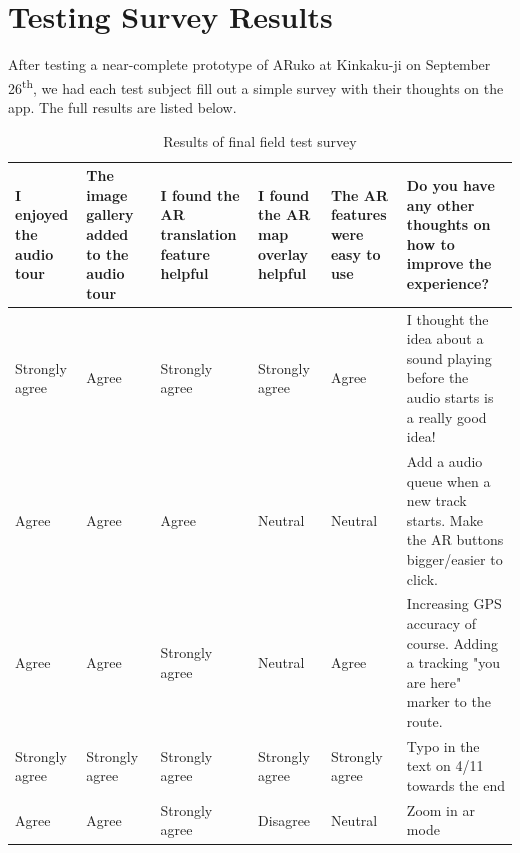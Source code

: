\documentclass[a4paper, 10pt, american, titlepage]{article}
\begin{document}
\clearpage

\section{Testing Survey Results}
\label{sec:testingSurveyResults}

After testing a near-complete prototype of ARuko at Kinkaku-ji on September
26\textsuperscript{th}, we had each test subject fill out a simple survey with
their thoughts on the app. The full results are listed below.


\begin{table}[h]
\begin{singlespace}
\begin{tabulary}{\textwidth}{ L | L | L | L | L | L }
	I enjoyed the audio tour & The image gallery added to the audio tour & I
	found the AR translation feature helpful & I found the AR map overlay
	helpful & The AR features were easy to use & Do you have any other thoughts
	on how to improve the experience? \\
	\hline

	Strongly agree & Agree & Strongly agree & Strongly agree & Agree & I thought
	the idea about a sound playing before the audio starts is a really good
	idea! \\

	Agree & Agree & Agree & Neutral & Neutral & Add a audio queue when a new
	track starts. Make the AR buttons bigger/easier to click. \\

	Agree & Agree & Strongly agree & Neutral & Agree & Increasing GPS accuracy
	of course. Adding a tracking "you are here" marker to the route. \\

	Strongly agree & Strongly agree & Strongly agree & Strongly agree & Strongly
	agree & Typo in the text on 4/11 towards the end \\

	Agree & Agree & Strongly agree & Disagree & Neutral & Zoom in ar mode \\
\end{tabulary}
\end{singlespace}
\caption{Results of final field test survey}
\label{tab:testingSurveyResults}
\end{table}
\end{document}
